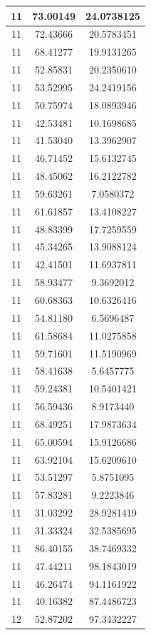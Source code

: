 \documentclass[
]{book}
\begin{document}
\begin{tabular}{c|c|c}
\hline
11 & 73.00149 & 24.0738125\\
\hline
11 & 72.43666 & 20.5783451\\
\hline
11 & 68.41277 & 19.9131265\\
\hline
11 & 52.85831 & 20.2350610\\
\hline
11 & 53.52995 & 24.2419156\\
\hline
11 & 50.75974 & 18.0893946\\
\hline
11 & 42.53481 & 10.1698685\\
\hline
11 & 41.53040 & 13.3962907\\
\hline
11 & 46.71452 & 15.6132745\\
\hline
11 & 48.45062 & 16.2122782\\
\hline
11 & 59.63261 & 7.0580372\\
\hline
11 & 61.61857 & 13.4108227\\
\hline
11 & 48.83399 & 17.7259559\\
\hline
11 & 45.34265 & 13.9088124\\
\hline
11 & 42.41501 & 11.6937811\\
\hline
11 & 58.93477 & 9.3692012\\
\hline
11 & 60.68363 & 10.6326416\\
\hline
11 & 54.81180 & 6.5696487\\
\hline
11 & 61.58684 & 11.0275858\\
\hline
11 & 59.71601 & 11.5190969\\
\hline
11 & 58.41638 & 5.6457775\\
\hline
11 & 59.24381 & 10.5401421\\
\hline
11 & 56.59436 & 8.9173440\\
\hline
11 & 68.49251 & 17.9873634\\
\hline
11 & 65.00594 & 15.9126686\\
\hline
11 & 63.92104 & 15.6209610\\
\hline
11 & 53.51297 & 5.8751095\\
\hline
11 & 57.83281 & 9.2223846\\
\hline
11 & 31.03292 & 28.9281419\\
\hline
11 & 31.33324 & 32.5385695\\
\hline
11 & 86.40155 & 38.7469332\\
\hline
11 & 47.44211 & 98.1843019\\
\hline
11 & 46.26474 & 94.1161922\\
\hline
11 & 40.16382 & 87.4486723\\
\hline
12 & 52.87202 & 97.3432227\\

\end{tabular}
\end{document}
